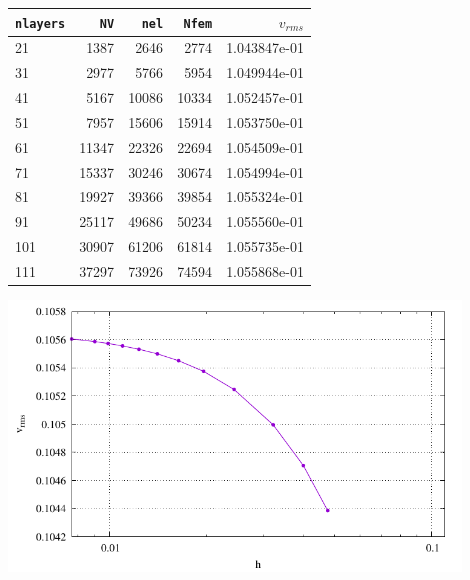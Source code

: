 \begin{center}
\begin{tabular}{lrrrr}
\hline
{\tt nlayers} & {\tt NV} & {\tt nel} & {\tt Nfem} & $v_{rms}$\\
\hline
\hline
21  &  1387 &  2646 &  2774 & 1.043847e-01\\ 
31  &  2977 &  5766 &  5954 & 1.049944e-01\\
41  &  5167 & 10086 & 10334 & 1.052457e-01\\
51  &  7957 & 15606 & 15914 & 1.053750e-01\\
61  & 11347 & 22326 & 22694 & 1.054509e-01\\
71  & 15337 & 30246 & 30674 & 1.054994e-01\\
81  & 19927 & 39366 & 39854 & 1.055324e-01\\
91  & 25117 & 49686 & 50234 & 1.055560e-01\\
101 & 30907 & 61206 & 61814 & 1.055735e-01\\
111 & 37297 & 73926 & 74594 & 1.055868e-01\\
\hline
\end{tabular}
\end{center}


\begin{center}
\includegraphics[width=12cm]{python_codes/fieldstone_58/experiment1/vrms}
\end{center}


